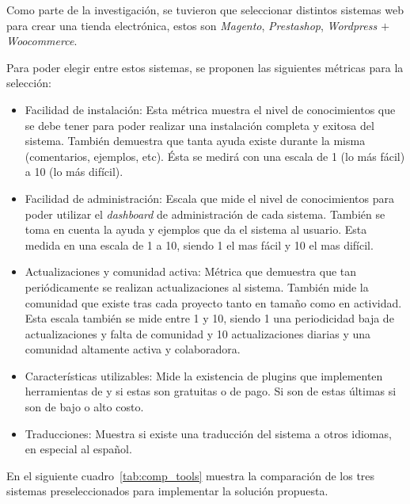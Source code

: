 Como parte de la investigación, se tuvieron que seleccionar distintos sistemas web para
crear una tienda electrónica, estos son \emph{Magento}, \emph{Prestashop}, \emph{Wordpress
$+$ Woocommerce}.

Para poder elegir entre estos sistemas, se proponen las siguientes métricas para
la selección:

\begin{itemize}

    \item Facilidad de instalación:
        Esta métrica muestra el nivel de conocimientos que se debe
        tener para poder realizar una instalación completa y exitosa del sistema.
        También demuestra que tanta ayuda existe durante la misma (comentarios,
        ejemplos, etc).
        Ésta se medirá con una escala de 1 (lo más fácil) a 10 (lo más difícil).

    \item Facilidad de administración:
        Escala que mide el nivel de conocimientos para poder utilizar el
        \emph{dashboard} de administración de cada sistema.
        También se toma en cuenta la ayuda y ejemplos que da el sistema al usuario.
        Esta medida en una escala de 1 a 10, siendo 1 el mas fácil y 10 el mas
        difícil.

    \item Actualizaciones y comunidad activa:
        Métrica que demuestra que tan periódicamente se realizan actualizaciones
        al sistema.
        También mide la comunidad que existe tras cada proyecto tanto en tamaño
        como en actividad.
        Esta escala también se mide entre 1 y 10, siendo 1 una periodicidad baja
        de actualizaciones y falta de comunidad y 10 actualizaciones diarias y
        una comunidad altamente activa y colaboradora.

    \item Características utilizables:
        Mide la existencia de plugins que implementen herramientas de {\GAM}
        y si estas son gratuitas o de pago.
        Si son de estas últimas si son de bajo o alto costo.

    \item Traducciones:
        Muestra si existe una traducción del sistema a otros idiomas, en especial
        al español.

\end{itemize}

En el siguiente cuadro~\ref{tab:comp_tools} muestra la comparación de los tres
sistemas preseleccionados para implementar la solución propuesta.

